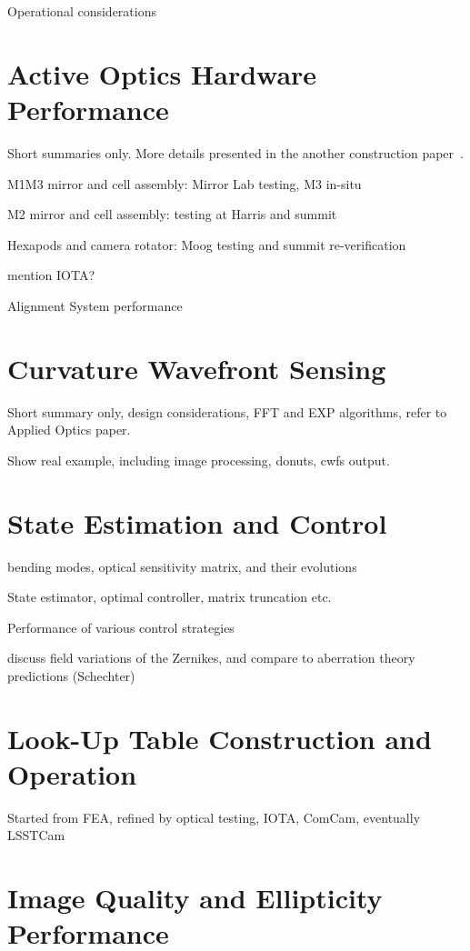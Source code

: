 Operational considerations

\section{Active Optics Hardware Performance}

Short summaries only. More details presented in the another construction paper~\cite{PSTN-032}.

M1M3 mirror and cell assembly: Mirror Lab testing, M3 in-situ

M2 mirror and cell assembly: testing at Harris and summit

Hexapods and camera rotator: Moog testing and summit re-verification

mention IOTA?

Alignment System performance

\section{Curvature Wavefront Sensing}

Short summary only, design considerations, FFT and EXP algorithms, refer to Applied Optics paper.

Show real example, including image processing, donuts, cwfs output.

\section{State Estimation and Control}

bending modes, optical sensitivity matrix, and their evolutions

State estimator, optimal controller, matrix truncation etc.

Performance of various control strategies

discuss field variations of the Zernikes, and compare to aberration theory predictions (Schechter)

\section{Look-Up Table Construction and Operation}

Started from FEA, refined by optical testing, IOTA, ComCam, eventually LSSTCam

\section{Image Quality and Ellipticity Performance}

